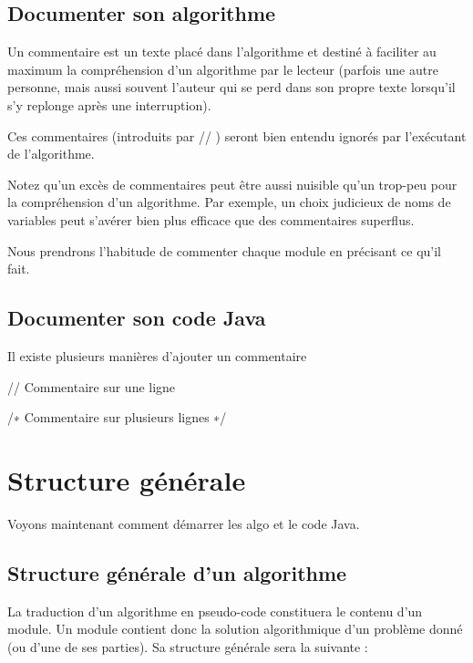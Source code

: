 \documentclass[11pt,a4paper]{article}
\begin{document}
        \subsection{Documenter son algorithme}
        Un commentaire est un texte plac\'e dans l'algorithme et destin\'e \`a faciliter au maximum 
        la compr\'ehension d'un algorithme par le lecteur (parfois une autre personne, 
        mais aussi souvent l'auteur qui se perd dans son propre texte lorsqu'il s'y replonge apr\`es une interruption). 
      
            \par
        
        Ces commentaires (introduits par \guillemotleft  // \guillemotright ) seront bien entendu ignor\'es par l'ex\'ecutant de l'algorithme.
      
            \par
        
        Notez qu'un exc\`es de commentaires peut \^etre aussi nuisible qu'un trop-peu pour la 
        compr\'ehension d'un algorithme. 
        Par exemple, un choix judicieux de noms de variables peut s'av\'erer bien plus efficace que des commentaires superflus.
      
            \par
        
        Nous prendrons l'habitude de commenter chaque module en pr\'ecisant ce qu'il fait.
      
            \par
        \subsection{Documenter son code Java}Il existe plusieurs mani\`eres d'ajouter un commentaire
            \par
        \begin{Java}
// Commentaire sur une ligne
\end{Java}\begin{Java}
  /∗ Commentaire sur
  plusieurs lignes ∗/
\end{Java}\section{Structure g\'en\'erale}
				Voyons maintenant comment d\'emarrer les algo et le code Java.
      
            \par
        \subsection{Structure g\'en\'erale d'un algorithme}
          La traduction d'un algorithme en pseudo-code constituera le contenu d'un module. 
          Un module contient donc la solution algorithmique d'un probl\`eme donn\'e (ou d'une de ses parties).
          Sa structure g\'en\'erale sera la suivante :
        
\end{document}
